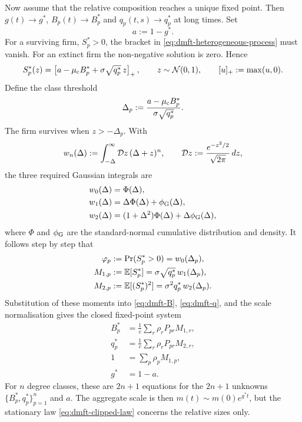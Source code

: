 Now assume that the relative composition reaches a unique fixed point.  Then
$g(t)\to g^*$, $B_p(t)\to B_p^*$ and $q_p(t,s)\to q_p^*$ at long times.  Set
\begin{equation}
    a:=1-g^*.
    \label{eq:dmft-a}
\end{equation}
For a surviving firm, $S_p^*>0$, the bracket in
\eqref{eq:dmft-heterogeneous-process} must vanish.  For an extinct firm the non-negative
solution is zero.  Hence
\begin{equation}
    S_p^*(z)=\left[a-\mu_{\rm c}B_p^*
                   +\sigma\sqrt{q_p^*}\,z\right]_+,
    \qquad z\sim\mathcal N(0,1),\qquad [u]_+:=\max(u,0).
    \label{eq:dmft-clipped-law}
\end{equation}
Define the class threshold
\begin{equation}
    \Delta_p:=\frac{a-\mu_{\rm c}B_p^*}{\sigma\sqrt{q_p^*}}.
    \label{eq:dmft-delta-p}
\end{equation}
The firm survives when $z>-\Delta_p$.  With
\begin{equation}
    w_n(\Delta):=\int_{-\Delta}^{\infty}\mathcal{D}z\,(\Delta+z)^n,
    \qquad \mathcal{D}z:=\frac{e^{-z^2/2}}{\sqrt{2\pi}}\,dz,
\end{equation}
the three required Gaussian integrals are
\begin{align}
    w_0(\Delta)&=\Phi(\Delta),\nonumber\\
    w_1(\Delta)&=\Delta\Phi(\Delta)+\phi_{\rm G}(\Delta),\nonumber\\
    w_2(\Delta)&=(1+\Delta^2)\Phi(\Delta)
                    +\Delta\phi_{\rm G}(\Delta),
    \label{eq:dmft-gaussian-moments}
\end{align}
where $\Phi$ and $\phi_{\rm G}$ are the standard-normal cumulative distribution and density.
It follows step by step that
\begin{align}
    \varphi_p&:=\Pr(S_p^*>0)=w_0(\Delta_p),
    \label{eq:dmft-class-survival}\\
    M_{1,p}&:=\mathbb{E}[S_p^*]
       =\sigma\sqrt{q_p^*}\,w_1(\Delta_p),
    \label{eq:dmft-class-first}\\
    M_{2,p}&:=\mathbb{E}[(S_p^*)^2]
       =\sigma^2q_p^*\,w_2(\Delta_p).
    \label{eq:dmft-class-second}
\end{align}
Substitution of these moments into \eqref{eq:dmft-B}, \eqref{eq:dmft-q}, and the scale
normalisation gives the closed fixed-point system
\begin{align}
    B_p^*&=\frac1c\sum_r\rho_rP_{pr}M_{1,r},
    \label{eq:dmft-fixed-B}\\
    q_p^*&=\frac1c\sum_r\rho_rP_{pr}M_{2,r},
    \label{eq:dmft-fixed-q}\\
    1&=\sum_p\rho_pM_{1,p},
    \label{eq:dmft-fixed-normalisation}\\
    g^*&=1-a.
    \label{eq:dmft-fixed-growth}
\end{align}
For $n$ degree classes, these are $2n+1$ equations for the $2n+1$ unknowns
$\{B_p^*,q_p^*\}_{p=1}^n$ and $a$.  The aggregate scale is then
$m(t)\sim m(0)e^{g^*t}$, but the stationary law \eqref{eq:dmft-clipped-law} concerns the
relative sizes only.

